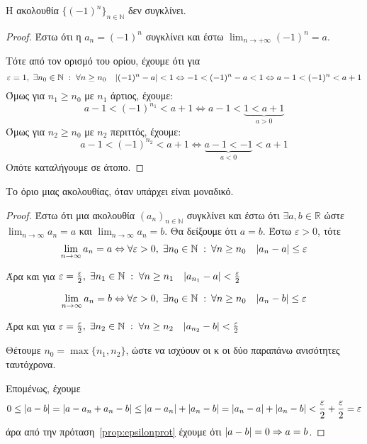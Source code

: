 \begin{mybox3}
  \begin{prop}
    Η ακολουθία $ \{ (-1)^{n} \}_{n \in \mathbb{N}} $ δεν συγκλίνει.
  \end{prop}
\end{mybox3}
\begin{proof}
\item {}
  Έστω ότι η $ a_{n}= (-1)^{n} $ συγκλίνει και έστω $ \lim_{n \to +
  \infty}(-1)^{n} = a $. 

  Τότε από τον ορισμό του ορίου, έχουμε ότι για 
  \[ 
    \varepsilon = 1, \; \exists n_{0} \in \mathbb{N} \; : \; \forall 
    n \geq n_{0} \quad \abs{(-1)^{n}-a} < 1 \Leftrightarrow -1 < 
    (-1)^{n} -a < 1 \Leftrightarrow a-1 < (-1)^{n} < a+1
  \]
  Όμως για $ n_{1} \geq n_{0} $ με $ n_{1} $ άρτιος, έχουμε:
  \[
    a-1 <  (-1)^{n_{1}} < a+1 \Leftrightarrow a-1 < 
    \underbrace{1 < a+1}_{a>0} 
  \] 
  Όμως για $ n_{2} \geq n_{0} $ με $ n_{2} $ περιττός, έχουμε:
  \[
    a-1 <  (-1)^{n_{2}} < a+1 \Leftrightarrow 
    \underbrace{a-1 < -1}_{a<0} < a+1
  \] 
  Οπότε καταλήγουμε σε άτοπο.
\end{proof}


\begin{mybox2}
  \begin{thm}
    Το όριο μιας ακολουθίας, όταν υπάρχει είναι μοναδικό.
  \end{thm}
\end{mybox2}
\begin{proof}
\item {}
  Έστω ότι μια ακολουθία $ (a_{n})_{n \in \mathbb{N}} $ συγκλίνει και έστω ότι 
  $ \exists a,b \in \mathbb{R} $ ώστε $ \lim_{n \to \infty} a_{n} = a $  και 
  $ \lim_{n \to \infty} a_{n} = b $. Θα δείξουμε ότι $ a=b $. Έστω 
  $ \varepsilon >0 $, τότε
  \[ 
    \lim_{n \to \infty} a_{n} = a \Leftrightarrow \forall 
    \varepsilon > 0, \; \exists n_{0} \in \mathbb{N} \; : \: 
    \forall n \geq n_{0} \quad \abs{a_{n}- a} \leq \varepsilon 
  \]

  Άρα και για $ \varepsilon = \frac{\varepsilon}{2}, \; \exists n_{1} \in 
  \mathbb{N} \; : \; \forall n \geq n_{1} \quad \abs{a_{n_{1}} - a} 
  < \frac{\varepsilon}{2}  $

  \[ 
    \lim_{n \to \infty} a_{n} = b \Leftrightarrow \forall 
    \varepsilon > 0, \; \exists n_{0} \in \mathbb{N} \; : \: 
    \forall n \geq n_{0} \quad \abs{a_{n}- b} \leq \varepsilon 
  \]

  Άρα και για $ \varepsilon = \frac{\varepsilon}{2}, \; \exists n_{2} \in 
  \mathbb{N} \; : \; \forall n \geq n_{2}  \quad 
  \abs{a_{n_{2}} - b} < \frac{\varepsilon}{2}  $

  Θέτουμε $ n_{0} = \max \{ n_{1}, n_{2} \} $, ώστε να ισχύουν οι 
  κ οι δύο παραπάνω ανισότητες ταυτόχρονα. 

  Επομένως, έχουμε 
  \[
    0 \leq \abs{a-b} = \abs{a- a_{n}+ a_{n}- b} \leq \abs{a- a_{n}} + \abs{a_{n}- b} =
    \abs{a_{n}-a} + \abs{a_{n}-b} < \frac{\varepsilon}{2} + \frac{\varepsilon}{2} =
    \varepsilon 
  \] 
  άρα από την πρόταση~\ref{prop:epsilonprot} έχουμε ότι 
  $ \abs{a-b} = 0 \Rightarrow a=b $.
\end{proof}


